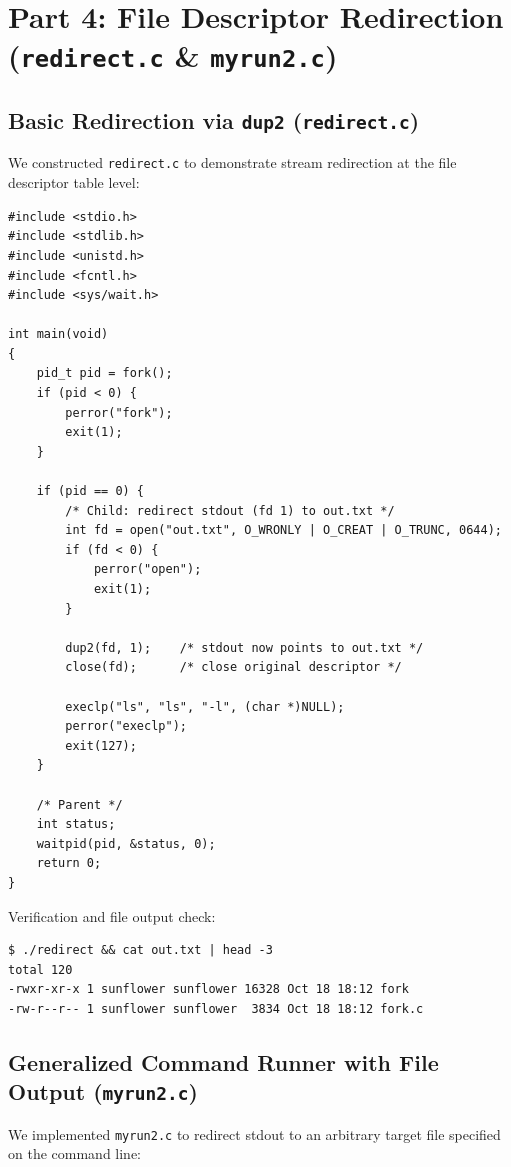 \documentclass[12pt,a4paper]{article}
\begin{document}
\newpage

\section{Part 4: File Descriptor Redirection (\texttt{redirect.c} \& \texttt{myrun2.c})}

\subsection{Basic Redirection via \texttt{dup2} (\texttt{redirect.c})}
We constructed \texttt{redirect.c} to demonstrate stream redirection at the file descriptor table level:

\begin{lstlisting}[style=cstyle]
#include <stdio.h>
#include <stdlib.h>
#include <unistd.h>
#include <fcntl.h>
#include <sys/wait.h>

int main(void)
{
    pid_t pid = fork();
    if (pid < 0) {
        perror("fork");
        exit(1);
    }

    if (pid == 0) {
        /* Child: redirect stdout (fd 1) to out.txt */
        int fd = open("out.txt", O_WRONLY | O_CREAT | O_TRUNC, 0644);
        if (fd < 0) {
            perror("open");
            exit(1);
        }

        dup2(fd, 1);    /* stdout now points to out.txt */
        close(fd);      /* close original descriptor */

        execlp("ls", "ls", "-l", (char *)NULL);
        perror("execlp");
        exit(127);
    }

    /* Parent */
    int status;
    waitpid(pid, &status, 0);
    return 0;
}
\end{lstlisting}

Verification and file output check:
\begin{lstlisting}[style=consolestyle]
$ ./redirect && cat out.txt | head -3
total 120
-rwxr-xr-x 1 sunflower sunflower 16328 Oct 18 18:12 fork
-rw-r--r-- 1 sunflower sunflower  3834 Oct 18 18:12 fork.c
\end{lstlisting}

\subsection{Generalized Command Runner with File Output (\texttt{myrun2.c})}
We implemented \texttt{myrun2.c} to redirect stdout to an arbitrary target file specified on the command line:
\end{document}
